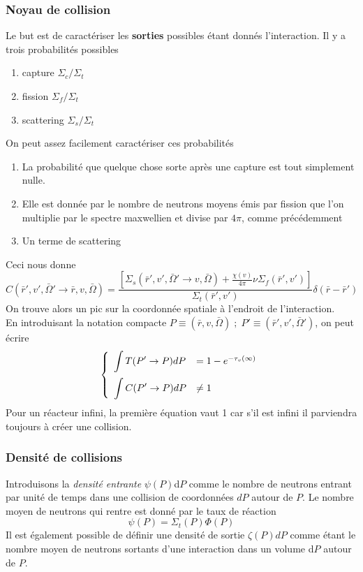 \subsubsection{Noyau de collision}
Le but est de caractériser les \textbf{sorties} possibles étant donnés l'interaction. Il y a trois 
probabilités possibles
\begin{enumerate}
\item capture $\Sigma_c/\Sigma_t$
\item fission $\Sigma_f/\Sigma_t$
\item scattering $\Sigma_s/\Sigma_t$
\end{enumerate}
On peut assez facilement caractériser ces probabilités
\begin{enumerate}
\item La probabilité que quelque chose sorte après une capture est tout simplement nulle.
\item Elle est donnée par le nombre de neutrons moyens émis par fission que l'on multiplie par le
spectre maxwellien et divise par $4\pi$, comme précédemment
\item Un terme de scattering
\end{enumerate}
Ceci nous donne
\begin{equation}
C(\bar r',v',\bar \Omega ' \to \bar r,v,\bar \Omega ) = \frac{{[{\Sigma _s}(\bar r',v',\bar \Omega ' \to v,\bar \Omega ) + \frac{{\chi (v)}}{{4\pi }}\nu {\Sigma _f}(\bar r',v')]}}{{{\Sigma _t}(\bar r',v')}}\delta (\bar r - \bar r')
\end{equation}
On trouve alors un pic sur la coordonnée spatiale à l'endroit de l'interaction.\\

En introduisant la notation compacte $P \equiv (\bar r,v,\bar \Omega )\;;\;P' \equiv (\bar r',v',
\bar \Omega ')$, on peut écrire
\begin{equation}
\left\{\begin{array}{ll}
\DS \int T(P'\to P)dP &= 1-e^{-\tau_v(\infty)}\vspace{2mm}\\
\DS \int C(P'\to P)dP &\neq 1
\end{array}\right.
\end{equation}
Pour un réacteur infini, la première équation vaut 1 car s'il est infini il parviendra toujours à 
créer une collision.  

\subsubsection{Densité de collisions}
Introduisons la \textit{densité entrante} $\psi(P)$d$P$ comme le nombre de neutrons entrant par 
unité de temps dans une collision de coordonnées $dP$ autour de $P$. Le nombre moyen de neutrons 
qui rentre est donné par le taux de réaction
\begin{equation}
\psi (P) = {\Sigma _t}(P)\varPhi (P)
\end{equation}
Il est également possible de définir une densité de sortie $\zeta (P)dP$ comme étant le nombre moyen de neutrons sortants d'une interaction dans un volume d$P$ autour de $P$. \\

